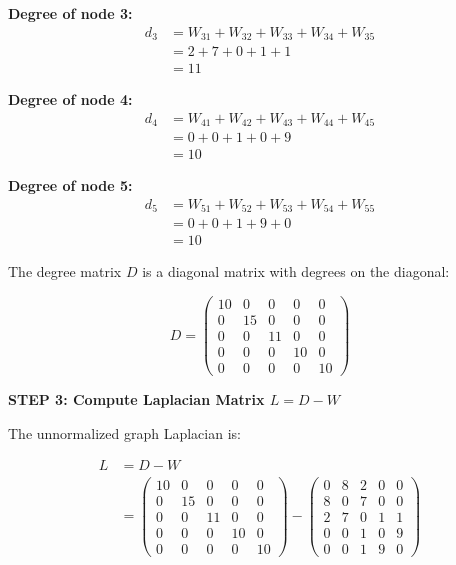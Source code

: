 \documentclass[12pt]{article}
\begin{document}
\begin{solution}
\textbf{Degree of node 3:}
\begin{align*}
d_3 &= W_{31} + W_{32} + W_{33} + W_{34} + W_{35} \\
&= 2 + 7 + 0 + 1 + 1 \\
&= 11
\end{align*}

\textbf{Degree of node 4:}
\begin{align*}
d_4 &= W_{41} + W_{42} + W_{43} + W_{44} + W_{45} \\
&= 0 + 0 + 1 + 0 + 9 \\
&= 10
\end{align*}

\textbf{Degree of node 5:}
\begin{align*}
d_5 &= W_{51} + W_{52} + W_{53} + W_{54} + W_{55} \\
&= 0 + 0 + 1 + 9 + 0 \\
&= 10
\end{align*}

The degree matrix $D$ is a diagonal matrix with degrees on the diagonal:

\[
\boxed{D = \begin{pmatrix}
10 & 0 & 0 & 0 & 0 \\
0 & 15 & 0 & 0 & 0 \\
0 & 0 & 11 & 0 & 0 \\
0 & 0 & 0 & 10 & 0 \\
0 & 0 & 0 & 0 & 10
\end{pmatrix}}
\]

\textbf{STEP 3: Compute Laplacian Matrix $L = D - W$}

The unnormalized graph Laplacian is:

\begin{align*}
L &= D - W \\
&= \begin{pmatrix}
10 & 0 & 0 & 0 & 0 \\
0 & 15 & 0 & 0 & 0 \\
0 & 0 & 11 & 0 & 0 \\
0 & 0 & 0 & 10 & 0 \\
0 & 0 & 0 & 0 & 10
\end{pmatrix} - \begin{pmatrix}
0 & 8 & 2 & 0 & 0 \\
8 & 0 & 7 & 0 & 0 \\
2 & 7 & 0 & 1 & 1 \\
0 & 0 & 1 & 0 & 9 \\
0 & 0 & 1 & 9 & 0
\end{pmatrix}
\end{align*}


\end{solution}
\end{document}
